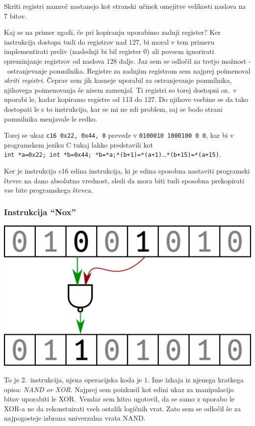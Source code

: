 \documentclass[12pt]{article}
\begin{document}
Skriti registri namreč nastanejo kot stranski učinek omejitve velikosti naslova na 7 bitov.

Kaj se na primer zgodi, če pri kopiranju uporabimo zadnji register?
Ker instrukcija dostopa tudi do registrov nad 127, bi moral v tem primeru implementirati preliv (naslednji bi bil register 0) ali povsem ignorirati spreminjanje registrov od naslova 128 dalje.
Jaz sem se odločil za tretjo možnost -\ ostranjevanje pomnilnika.
Registre za zadnjim registrom sem najprej poimenoval \textit{skriti registri}.
Čeprav sem jih kasneje uporabil za ostranjevanje pomnilnika, njihovega poimenovanja še nisem zamenjal.
Ti registri so torej dostopni oz.\ v uporabi le, kadar kopiramo registre od 113 do 127.
Do njihove vsebine se da tako dostopati le s to instrukcijo, kar se mi ne zdi problem, saj se bodo strani pomnilnika menjavale le redko.

Torej se ukaz \verb|c16 0x22, 0x44, 0| prevede v \verb|0100010 1000100 0 0|, kar bi v programskem jeziku C tukaj lahko predstavili kot \\
\verb|int *a=0x22; int *b=0x44; *b=*a;*(b+1)=*(a+1)|\ldots \verb|*(b+15)=*(a+15)|.

Ker je instrukcija c16 edina instrukcija, ki je edina sposobna nastaviti programski števec na dano absolutno vrednost, sledi da mora biti tudi sposobna prekopirati vse bite programskega števca.

\subsubsection{Instrukcija ``Nox''}

\begin{center}
  \includegraphics[width=.3\linewidth]{slike/predstavitev/nand.png}
\end{center}

To je 2.\ instrukcija, njena operacijska koda je $1$.
Ime izhaja iz njenega kratkega opisa: \textit{NAND or XOR}.
Najprej sem poizkusil kot edini ukaz za manipulacijo bitov uporabiti le XOR.\
Vendar sem hitro ugotovil, da se samo z uporabo le XOR-a ne da rekonstuirati vseh ostalih logičnih vrat.
Zato sem se odločil še za najpogosteje izbrana univerzalna vrata NAND.\@
\end{document}
